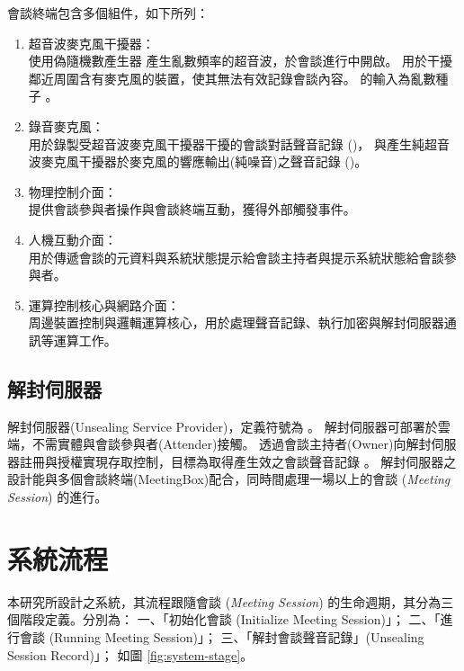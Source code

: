     會談終端包含多個組件，如下所列：

    \begin{enumerate}
        \item 超音波麥克風干擾器：\\
            使用偽隨機數產生器 \DEFfuncPRNG{} 產生亂數頻率的超音波，於會談進行中開啟。
            用於干擾鄰近周圍含有麥克風的裝置，使其無法有效記錄會談內容。
            \DEFfuncPRNG{} 的輸入為亂數種子 \DEFseed。

        \item 錄音麥克風：\\
            用於錄製受超音波麥克風干擾器干擾的會談對話聲音記錄 (\DEFrecJ)，
            與產生純超音波麥克風干擾器於麥克風的響應輸出(純噪音)之聲音記錄 (\DEFrecN)。

        \item 物理控制介面：\\
            提供會談參與者操作與會談終端互動，獲得外部觸發事件。

        \item 人機互動介面：\\
            用於傳遞會談的元資料與系統狀態提示給會談主持者與提示系統狀態給會談參與者。

        \item 運算控制核心與網路介面：\\
            周邊裝置控制與邏輯運算核心，用於處理聲音記錄、執行加密與解封伺服器通訊等運算工作。
    \end{enumerate}


\subsection{解封伺服器}

    解封伺服器(Unsealing Service Provider)，定義符號為 \DEFserver。
解封伺服器可部署於雲端，不需實體與會談參與者(Attender)接觸。
透過會談主持者(Owner)向解封伺服器註冊與授權實現存取控制，目標為取得產生效之會談聲音記錄 \DEFrecREV。
解封伺服器之設計能與多個會談終端(MeetingBox)配合，同時間處理一場以上的會談 ({\it Meeting Session}) 的進行。


\section{系統流程}\label{sec:system-flow}

    本研究所設計之系統，其流程跟隨會談 ({\it Meeting Session}) 的生命週期，其分為三個階段定義。分別為：
一、「初始化會談 (Initialize Meeting Session)」；
二、「進行會談 (Running Meeting Session)」；
三、「解封會談聲音記錄」(Unsealing Session Record)」；
如圖 \ref{fig:system-stage}。


